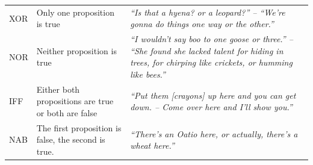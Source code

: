 \documentclass[floatsintext,man]{apa6}
\theoremstyle{definition}
\theoremstyle{definition}
\theoremstyle{definition}
\theoremstyle{remark}
\begin{document}
\begin{longtable}[]{@{}lll@{}}
\begin{minipage}[t]{0.07\columnwidth}
XOR\strut
\end{minipage} & \begin{minipage}[t]{0.36\columnwidth}\raggedright\strut
Only one proposition is true\strut
\end{minipage} & \begin{minipage}[t]{0.48\columnwidth}\raggedright\strut
\emph{\enquote{Is that a hyena? or a leopard?} -- \enquote{We're gonna
do things one way or the other.}}\strut
\end{minipage}\tabularnewline
\begin{minipage}[t]{0.07\columnwidth}\raggedright\strut
NOR\strut
\end{minipage} & \begin{minipage}[t]{0.36\columnwidth}\raggedright\strut
Neither proposition is true\strut
\end{minipage} & \begin{minipage}[t]{0.48\columnwidth}\raggedright\strut
\emph{\enquote{I wouldn't say boo to one goose or three.} --
\enquote{She found she lacked talent for hiding in trees, for chirping
like crickets, or humming like bees.}}\strut
\end{minipage}\tabularnewline
\begin{minipage}[t]{0.07\columnwidth}\raggedright\strut
IFF\strut
\end{minipage} & \begin{minipage}[t]{0.36\columnwidth}\raggedright\strut
Either both propositions are true or both are false\strut
\end{minipage} & \begin{minipage}[t]{0.48\columnwidth}\raggedright\strut
\emph{\enquote{Put them {[}crayons{]} up here and you can get down. --
Come over here and I'll show you.}}\strut
\end{minipage}\tabularnewline
\begin{minipage}[t]{0.07\columnwidth}\raggedright\strut
NAB\strut
\end{minipage} & \begin{minipage}[t]{0.36\columnwidth}\raggedright\strut
The first proposition is false, the second is true.\strut
\end{minipage} & \begin{minipage}[t]{0.48\columnwidth}\raggedright\strut
\emph{\enquote{There's an Oatio here, or actually, there's a wheat
here.}}\strut
\end{minipage}\tabularnewline
\bottomrule
\end{longtable}
\end{document}
